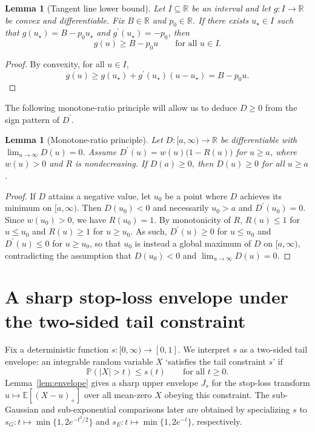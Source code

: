 \documentclass[11pt]{article}
\newcommand{\R}{\mathbb{R}}
\newcommand{\Pbb}{\mathbb{P}}
\newcommand{\Ebb}{\mathbb{E}}
\newtheorem{lemma}[theorem]{Lemma}
\begin{document}
\begin{lemma}[Tangent line lower bound]\label{lem:tangent}
Let $I \subseteq \R$ be an interval and let $g : I \to \R$ be convex and differentiable.
Fix $B \in \R$ and $p_0 \in \R$. If there exists $u_\star \in I$ such that
$g(u_\star) = B - p_0 u_\star$ and $g^{\prime} (u_\star) = -p_0$, then
\[
g(u) \ge B - p_0 u \qquad \text{for all } u \in I.
\]
\end{lemma}

\begin{proof}
By convexity, for all $u \in I$,
%
\[
g(u) \ge g(u_\star) + g^{\prime} (u_\star) (u - u_\star) = B - p_0u.
\]
%
\end{proof}

The following monotone-ratio principle will allow us to deduce $D\ge 0$ from the sign pattern of $D^{\prime}$.

\begin{lemma}[Monotone-ratio principle]
\label{lem:monotone_ratio_principle}
Let $D : [a, \infty) \to \R$ be differentiable with $\lim_{u\to\infty} D(u) = 0$.
Assume $D^{\prime}(u) = w(u) \bigl(1 - R(u) \bigr)$ for $u \ge a$, where $w(u) > 0$ and $R$ is nondecreasing.
If $D(a) \ge 0$, then $D(u) \ge 0$ for all $u \ge a$.
\end{lemma}

\begin{proof}
If $D$ attains a negative value, let $u_0$ be a point where $D$ achieves its minimum on $[a,\infty)$.
Then $D(u_0) < 0$ and necessarily $u_0 > a$ and $D^{\prime}(u_0) = 0$.
Since $w(u_0) > 0$, we have $R(u_0) = 1$.
By monotonicity of $R$, $R(u) \le 1$ for $u \le u_0$ and $R(u) \ge 1$ for $u\ge u_0$. 
As such, $D^{\prime}(u) \ge 0$ for $u\le u_0$ and $D^{\prime}(u) \le 0$ for $u\ge u_0$, so that $u_0$ is instead a global maximum of $D$ on $[a, \infty)$, contradicting the assumption that $D(u_0) < 0$ and $\lim_{u\to\infty}D(u)=0$.
\end{proof}

\section{A sharp stop-loss envelope under the two-sided tail constraint}

Fix a deterministic function \(s : [0, \infty) \to [0, 1]\). We interpret \(s\) as a two-sided tail envelope: an integrable random variable \(X\) `satisfies the tail constraint \(s\)' if
%
\[
\Pbb (|X|>t) \le s(t) \qquad \text{for all } t \ge 0.
\]
%
Lemma~\ref{lem:envelope} gives a sharp upper envelope \(J_s\) for the stop-loss transform \(u \mapsto \Ebb[(X-u)_+]\) over all mean-zero \(X\) obeying this constraint. The sub-Gaussian and sub-exponential comparisons later are obtained by specializing \(s\) to \(s_G : t \mapsto \min\{1, 2e^{-t^2/2}\}\) and \(s_E : t\mapsto \min \{1, 2e^{-t} \} \), respectively.
\end{document}
